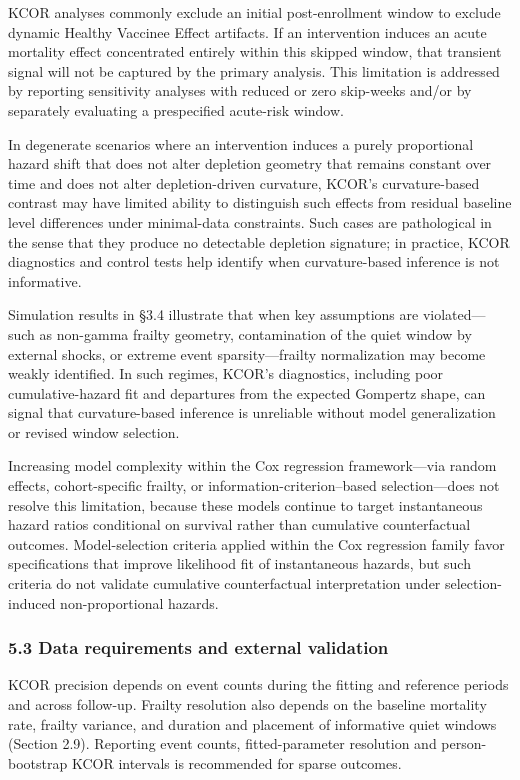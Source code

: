 \documentclass[
]{article}
\begin{document}
KCOR analyses commonly exclude an initial post-enrollment window to exclude dynamic Healthy Vaccinee Effect artifacts. If an intervention induces an acute mortality effect concentrated entirely within this skipped window, that transient signal will not be captured by the primary analysis. This limitation is addressed by reporting sensitivity analyses with reduced or zero skip-weeks and/or by separately evaluating a prespecified acute-risk window.

In degenerate scenarios where an intervention induces a purely proportional hazard shift that does not alter depletion geometry that remains constant over time and does not alter depletion-driven curvature, KCOR's curvature-based contrast may have limited ability to distinguish such effects from residual baseline level differences under minimal-data constraints. Such cases are pathological in the sense that they produce no detectable depletion signature; in practice, KCOR diagnostics and control tests help identify when curvature-based inference is not informative.

Simulation results in §3.4 illustrate that when key assumptions are violated---such as non-gamma frailty geometry, contamination of the quiet window by external shocks, or extreme event sparsity---frailty normalization may become weakly identified. In such regimes, KCOR's diagnostics, including poor cumulative-hazard fit and departures from the expected Gompertz shape, can signal that curvature-based inference is unreliable without model generalization or revised window selection.

Increasing model complexity within the Cox regression framework---via random effects, cohort-specific frailty, or information-criterion--based selection---does not resolve this limitation, because these models continue to target instantaneous hazard ratios conditional on survival rather than cumulative counterfactual outcomes. Model-selection criteria applied within the Cox regression family favor specifications that improve likelihood fit of instantaneous hazards, but such criteria do not validate cumulative counterfactual interpretation under selection-induced non-proportional hazards.

\subsubsection{5.3 Data requirements and external validation}\label{data-requirements-and-external-validation}

KCOR precision depends on event counts during the fitting and reference periods and across follow-up. Frailty resolution also depends on the baseline mortality rate, frailty variance, and duration and placement of informative quiet windows (Section 2.9). Reporting event counts, fitted-parameter resolution and person-bootstrap KCOR intervals is recommended for sparse outcomes.
\end{document}
